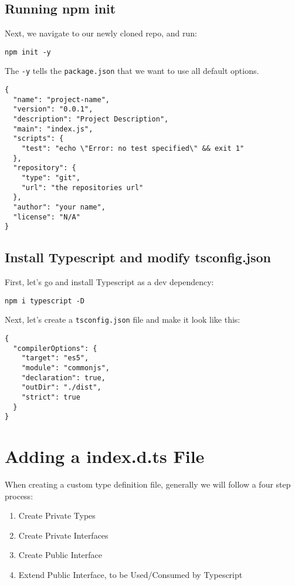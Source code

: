 \subsection{Running npm init}
Next, we navigate to our newly cloned repo, and run: 
\begin{verbatim}
npm init -y
\end{verbatim}
The \lstinline{-y} tells the \lstinline{package.json} that we want to use all
default options. 
\begin{lstlisting}[caption=package.json]  
{
  "name": "project-name",
  "version": "0.0.1",
  "description": "Project Description",
  "main": "index.js",
  "scripts": {
    "test": "echo \"Error: no test specified\" && exit 1"
  },
  "repository": {
    "type": "git",
    "url": "the repositories url"
  },
  "author": "your name",
  "license": "N/A"
}
\end{lstlisting}

\subsection{Install Typescript and modify tsconfig.json}
First, let's go and install Typescript as a dev dependency: 
\begin{verbatim}
npm i typescript -D  
\end{verbatim}

Next, let's create a \lstinline{tsconfig.json} file and make it look like this:
\begin{lstlisting}
{
  "compilerOptions": {
    "target": "es5",
    "module": "commonjs",
    "declaration": true,
    "outDir": "./dist",
    "strict": true
  }
}  
\end{lstlisting}

\section{Adding a index.d.ts File}
When creating a custom type definition file, generally we will follow a four
step process:
\begin{enumerate}
  \item Create Private Types
  \item Create Private Interfaces
  \item Create Public Interface 
  \item Extend Public Interface, to be Used/Consumed by Typescript
\end{enumerate}

